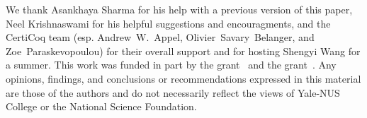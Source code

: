 \documentclass[acmsmall]{acmart}\settopmatter{}
\newcommand\hide[1]{}
\begin{document}
\begin{acks}
We thank Asankhaya Sharma for his help with a previous version of this paper,
Neel Krishnaswami for his helpful suggestions and encouragments, and the 
CertiCoq team (esp. Andrew~W.~Appel, Olivier~Savary~Belanger, and 
Zoe~Paraskevopoulou) for their overall support and for hosting 
Shengyi Wang for a summer. This work was funded in part by the
 grant~\mbox{} and the  grant~.
Any opinions, findings, and conclusions or recommendations expressed in 
this material are those of the authors and do not necessarily reflect the 
views of Yale-NUS College or the National Science Foundation.
\hide{

  This material is based upon work supported by the
  \grantsponsor{GS100000001}{National Science
    Foundation}{http://dx.doi.org/10.13039/100000001} under Grant
  No.~\grantnum{GS100000001}{nnnnnnn} and Grant
  No.~\grantnum{GS100000001}{mmmmmmm}.  Any opinions, findings, and
  conclusions or recommendations expressed in this material are those
  of the author and do not necessarily reflect the views of the
  National Science Foundation.}
\end{acks}





\end{document}
